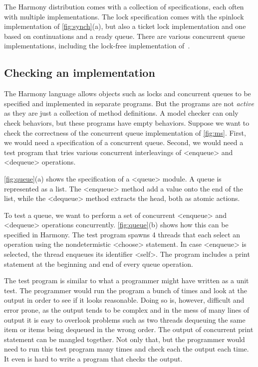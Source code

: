 \documentclass[twocolumn]{article}
\begin{document}
The Harmony distribution comes with a collection of specifications,
each often with multiple implementations.  The lock specification
comes with the spinlock implementation of \autoref{fig:synch}(a), but
also a ticket lock implementation and one based on continuations and
a ready queue.  There are various concurrent queue implementations,
including the lock-free implementation of~\cite{MS96}.

\subsection{Checking an implementation}

The Harmony language allows objects such as locks and concurrent queues
to be specified and implemented in separate programs.  But the programs
are not \emph{active} as they are just a collection of method definitions.
A model checker can only check behaviors, but these programs have empty
behaviors.
Suppose we want to check the correctness of the concurrent queue
implementation of \autoref{fig:ms}.  First, we would need a specification
of a concurrent queue.  Second, we would need a test program that tries
various concurrent interleavings of <{enqueue}> and <{dequeue}> operations.

\autoref{fig:queue}(a) shows the specification of a <{queue}> module.
A queue is represented as a list.
The <{enqueue}> method add a value onto the end of the list,
while the <{dequeue}> method extracts the head, both as atomic actions.

To test a queue, we want to perform a set of concurrent <{enqueue}>
and <{dequeue}> operations concurrently.
\autoref{fig:queue}(b) shows how this can be specified in Harmony.
The test program spawns 4 threads that each select an operation
using the nondetermistic <{choose}> statement.  In case <{enqueue}>
is selected, the thread enqueues its identifier <{self}>.  The program
includes a print statement at the beginning and end of every queue
operation.

The test program is similar to what a programmer might have written
as a unit test.  The programmer would run the program a bunch of
times and look at the output in order to see if it looks reasonable.
Doing so is, however, difficult and error prone, as the output tends
to be complex and in the mess of many lines of output it is easy
to overlook problems such as two threads dequeuing the same item
or items being dequeued in the wrong order.  The output of concurrent
print statement can be mangled together.  Not only that, but the
programmer would need to run this test program many times and check
each the output each time.  It even is hard to write a program that
checks the output.
\end{document}
